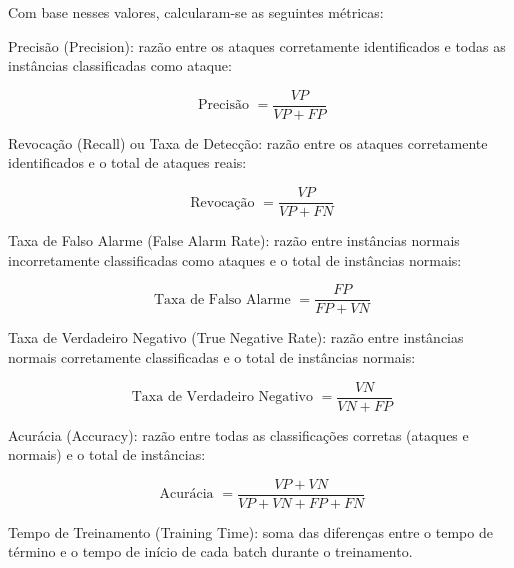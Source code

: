 \documentclass[conference]{IEEEtran}
\begin{document}
    Com base nesses valores, calcularam-se as seguintes métricas:
    
    \hspace{1cm}
    
    Precisão (Precision): razão entre os ataques corretamente identificados e todas as instâncias classificadas como ataque:

    \begin{equation}
    \text { Precisão }=\frac{V P}{V P+F P}
    \end{equation}
    \hspace{1cm}
    
    Revocação (Recall) ou Taxa de Detecção: razão entre os ataques corretamente identificados e o total de ataques reais:

    \begin{equation}
    \text { Revocação }=\frac{V P}{V P+F N}
    \end{equation}
    \hspace{1cm}
    
    Taxa de Falso Alarme (False Alarm Rate): razão entre instâncias normais incorretamente classificadas como ataques e o total de instâncias normais:

    \begin{equation}
    \text { Taxa de Falso Alarme }=\frac{F P}{F P+V N}
    \end{equation}
    \hspace{1cm}
    
    Taxa de Verdadeiro Negativo (True Negative Rate): razão entre instâncias normais corretamente classificadas e o total de instâncias normais:

    \begin{equation}
    \text { Taxa de Verdadeiro Negativo }=\frac{V N}{V N+F P}
    \end{equation}
    \hspace{1cm}
    
    Acurácia (Accuracy): razão entre todas as classificações corretas (ataques e normais) e o total de instâncias:

    \begin{equation}
    \text { Acurácia }=\frac{V P+V N}{V P+V N+F P+F N}
    \end{equation}
    \hspace{1cm}

    Tempo de Treinamento (Training Time): soma das diferenças entre o tempo de término e o tempo de início de cada batch durante o treinamento.
    
\end{document}
